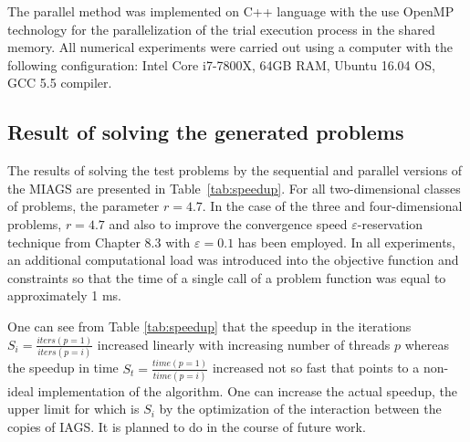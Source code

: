 \documentclass[runningheads]{llncs}
\begin{document}
The parallel method was implemented on C++ language with the use OpenMP technology for
the parallelization of the trial execution process in the shared memory.
All numerical experiments were carried out using a computer with the following  configuration:
Intel Core i7-7800X, 64GB RAM, Ubuntu 16.04 OS, GCC 5.5 compiler.

\subsection{Result of solving the generated problems}

The results of solving the test problems by the sequential and parallel versions of the
MIAGS are presented in Table~\ref{tab:speedup}.
For all two-dimensional classes of problems, the parameter \(r=4.7\).
In the case of the three and four-dimensional problems, \(r=4.7\) and also to improve the convergence speed
\(\varepsilon\)-reservation technique from \cite{Strongin2000} Chapter 8.3 with
\(\varepsilon=0.1\) has been employed.
In all experiments, an additional computational load was introduced into the objective function
and constraints so that the time of a single call of a problem function was equal to
approximately 1 ms.

One can see from Table \ref{tab:speedup} that the speedup in the iterations \(S_i=\frac{iters(p=1)}{iters(p=i)}\) increased
linearly with increasing number of threads \(p\) whereas the speedup in time \(S_t=\frac{time(p=1)}{time(p=i)}\) increased
not so fast that points to a non-ideal implementation of the algorithm.
One can increase the actual speedup, the upper limit for which is \(S_i\) by the optimization of
the interaction between the copies of IAGS. It is planned to do in the course of future work.
\end{document}
